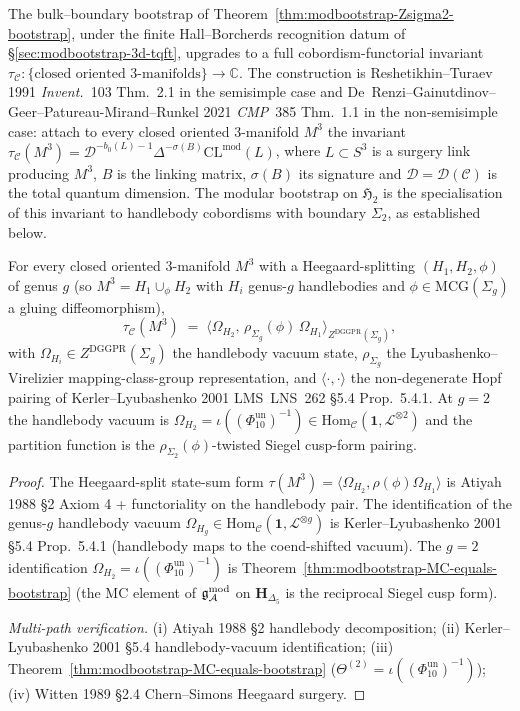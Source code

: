 The bulk--boundary bootstrap of
Theorem~\ref{thm:modbootstrap-Zsigma2-bootstrap}, under the finite
Hall--Borcherds recognition datum of
\S\ref{sec:modbootstrap-3d-tqft}, upgrades to a
full cobordism-functorial invariant $\tau_{\mathcal C}\colon
\{\text{closed oriented 3-manifolds}\}\to\mathbb C$. The construction
is Reshetikhin--Turaev 1991 \emph{Invent.}~103 Thm.~2.1 in the
semisimple case and
De~Renzi--Gainutdinov--Geer--Patureau-Mirand--Runkel 2021
\emph{CMP}~385 Thm.~1.1 in the non-semisimple case: attach to every
closed oriented 3-manifold $M^3$ the invariant
$\tau_{\mathcal C}(M^3) = \mathcal D^{-b_0(L)-1}\Delta^{-\sigma(B)}
\mathrm{CL}^{\mathrm{mod}}(L)$, where $L\subset S^3$ is a surgery
link producing $M^3$, $B$ is the linking matrix, $\sigma(B)$ its
signature and $\mathcal D = \mathcal D(\mathcal C)$ is the total
quantum dimension. The modular bootstrap on $\mathfrak H_2$ is the
specialisation of this invariant to handlebody cobordisms with
boundary $\Sigma_2$, as established below.

\begin{theorem}
\label{thm:modbootstrap-state-sum}
For every closed oriented 3-manifold $M^3$ with a
Heegaard-splitting $(H_1, H_2, \phi)$ of genus $g$ (so
$M^3 = H_1\cup_\phi H_2$ with $H_i$ genus-$g$ handlebodies and
$\phi\in\mathrm{MCG}(\Sigma_g)$ a gluing diffeomorphism),
\[
 \tau_{\mathcal C}(M^3)
 \;=\;
 \bigl\langle\Omega_{H_2},\,\rho_{\Sigma_g}(\phi)\,\Omega_{H_1}
 \bigr\rangle_{Z^{\mathrm{DGGPR}}(\Sigma_g)},
\]
with $\Omega_{H_i}\in Z^{\mathrm{DGGPR}}(\Sigma_g)$ the handlebody
vacuum state, $\rho_{\Sigma_g}$ the Lyubashenko--Virelizier mapping-class-group
representation, and $\langle\cdot,\cdot\rangle$ the non-degenerate
Hopf pairing of Kerler--Lyubashenko 2001 LMS~LNS~262 \S 5.4
Prop.~5.4.1. At $g = 2$ the handlebody vacuum is
$\Omega_{H_2} = \iota((\Phi_{10}^{\mathrm{un}})^{-1})\in
\mathrm{Hom}_{\mathcal C}(\mathbf 1, \mathcal L^{\otimes 2})$ and the
partition function is the $\rho_{\Sigma_2}(\phi)$-twisted Siegel
cusp-form pairing.
\end{theorem}

\begin{proof}
The Heegaard-split state-sum form
$\tau(M^3) = \langle\Omega_{H_2}, \rho(\phi)\Omega_{H_1}\rangle$ is
Atiyah 1988 \S 2 Axiom 4 + functoriality on the handlebody pair.
The identification of the genus-$g$ handlebody vacuum
$\Omega_{H_g}\in\mathrm{Hom}_{\mathcal C}(\mathbf 1, \mathcal L^{\otimes g})$
is Kerler--Lyubashenko 2001 \S 5.4 Prop.~5.4.1 (handlebody maps to
the coend-shifted vacuum). The $g = 2$ identification
$\Omega_{H_2} = \iota((\Phi_{10}^{\mathrm{un}})^{-1})$ is
Theorem~\ref{thm:modbootstrap-MC-equals-bootstrap} (the MC
element of $\mathfrak{g}_{\mathcal{A}}^{\mathrm{mod}}$ on $\mathbf H_{\Delta_5}$ is the reciprocal
Siegel cusp form).

\emph{Multi-path verification.}
(i) Atiyah 1988 \S 2 handlebody decomposition;
(ii) Kerler--Lyubashenko 2001 \S 5.4 handlebody-vacuum identification;
(iii) Theorem~\ref{thm:modbootstrap-MC-equals-bootstrap}
($\Theta^{(2)} = \iota((\Phi_{10}^{\mathrm{un}})^{-1})$);
(iv) Witten 1989 \S 2.4 Chern--Simons Heegaard surgery.
\end{proof}

